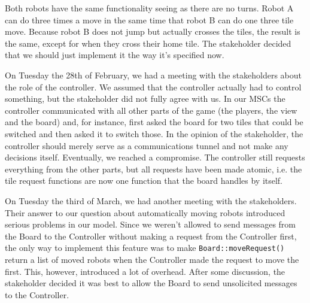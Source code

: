 \bigskip
Both robots have the same functionality seeing as there are no turns. Robot A can do three times a move in the same time that robot B can do one three tile move. Because robot B does not jump but actually crosses the tiles, the result is the same, except for when they cross their home tile. The stakeholder decided that we should just implement it the way it's specified now.

On Tuesday the 28th of February, we had a meeting with the stakeholders about the role of the controller. We assumed that the controller actually had to control something, but the stakeholder did not fully agree with us. In our MSCs the controller communicated with all other parts of the game (the players, the view and the board) and, for instance, first asked the board for two tiles that could be switched and then asked it to switch those. In the opinion of the stakeholder, the controller should merely serve as a communications tunnel and not make any decisions itself. Eventually, we reached a compromise. The controller still requests everything from the other parts, but all requests have been made atomic, i.e. the tile request functions are now one function that the board handles by itself.

On Tuesday the third of March, we had another meeting with the stakeholders. Their answer to our question about automatically moving robots introduced serious problems in our model. Since we weren't allowed to send messages from the Board to the Controller without making a request from the Controller first, the only way to implement this feature was to make \texttt{Board::moveRequest()} return a list of moved robots when the Controller made the request to move the first. This, however, introduced a lot of overhead. After some discussion, the stakeholder decided it was best to allow the Board to send unsolicited messages to the Controller.
